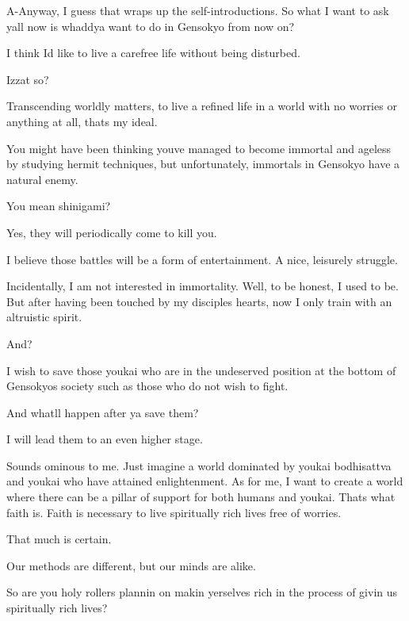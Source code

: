 \begin{tcolorbox}[breakable, colback=white, colframe=black!80,
  boxrule=0.6pt, arc=0mm, left=3mm, right=3mm, top=2mm, bottom=2mm]
A-{}Anyway, I guess that wraps up the self-{}introductions. So what I want to ask y\textquotesingle{}all now is whaddya want to do in Gensokyo from now on?\par
\medskip
I think I\textquotesingle{}d like to live a carefree life without being disturbed.\par
\medskip
Izzat so?\par
\medskip
Transcending worldly matters, to live a refined life in a world with no worries or anything at all, that\textquotesingle{}s my ideal.\par
\medskip
You might have been thinking you\textquotesingle{}ve managed to become immortal and ageless by studying hermit techniques, but unfortunately, immortals in Gensokyo have a natural enemy.\par
\medskip
You mean shinigami?\par
\medskip
Yes, they will periodically come to kill you.\par
\medskip
I believe those battles will be a form of entertainment. A nice, leisurely struggle.\par
\medskip
Incidentally, I am not interested in immortality. Well, to be honest, I used to be. But after having been touched by my disciples\textquotesingle{} hearts, now I only train with an altruistic spirit.\par
\medskip
And?\par
\medskip
I wish to save those youkai who are in the undeserved position at the bottom of Gensokyo\textquotesingle{}s society such as those who do not wish to fight.\par
\medskip
And what\textquotesingle{}ll happen after ya save them?\par
\medskip
I will lead them to an even higher stage.\par
\medskip
Sounds ominous to me. Just imagine a world dominated by youkai bodhisattva and youkai who have attained enlightenment. As for me, I want to create a world where there can be a pillar of support for both humans and youkai. That\textquotesingle{}s what faith is. Faith is necessary to live spiritually rich lives free of worries.\par
\medskip
That much is certain.\par
\medskip
Our methods are different, but our minds are alike.\par
\medskip
So are you holy rollers plannin\textquotesingle{} on makin\textquotesingle{} yerselves rich in the process of givin\textquotesingle{} us spiritually rich lives?\par

\end{tcolorbox}
